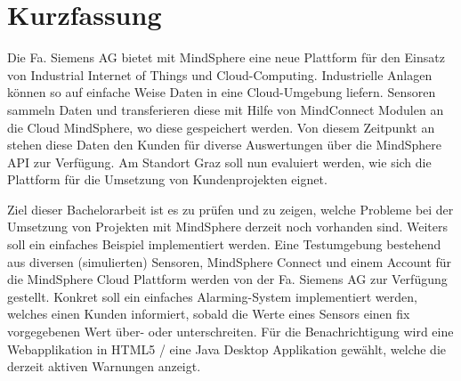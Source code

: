 \chapter{Kurzfassung}

Die Fa. Siemens AG bietet mit MindSphere eine neue Plattform für den Einsatz von Industrial Internet of Things und Cloud-Computing. Industrielle Anlagen können so auf einfache Weise Daten in eine Cloud-Umgebung liefern. Sensoren sammeln Daten und transferieren diese mit Hilfe von MindConnect Modulen an die Cloud MindSphere, wo diese gespeichert werden. Von diesem Zeitpunkt an stehen diese Daten den Kunden für diverse Auswertungen über die MindSphere API zur Verfügung. Am Standort Graz soll nun evaluiert werden, wie sich die Plattform für die Umsetzung von Kundenprojekten eignet. 

Ziel dieser Bachelorarbeit ist es zu prüfen und zu zeigen, welche Probleme bei der Umsetzung von Projekten mit MindSphere derzeit noch vorhanden sind. Weiters soll ein einfaches Beispiel implementiert werden. Eine Testumgebung bestehend aus diversen (simulierten) Sensoren, MindSphere Connect und einem Account für die MindSphere Cloud Plattform werden von der Fa. Siemens AG zur Verfügung gestellt. Konkret soll ein einfaches Alarming-System implementiert werden, welches einen Kunden informiert, sobald die Werte eines Sensors einen fix vorgegebenen Wert über- oder unterschreiten. Für die Benachrichtigung wird eine Webapplikation in HTML5 / eine Java Desktop Applikation gewählt, welche die derzeit aktiven Warnungen anzeigt.
